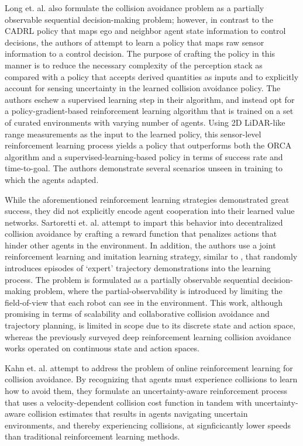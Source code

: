 \documentclass[conference]{IEEEtran}
\begin{document}
Long et. al. \cite{long2018} also formulate the collision avoidance problem as a partially observable sequential decision-making problem; however, in contrast to the CADRL policy that maps ego and neighbor agent state information to control decisions, the authors of \cite{long2018} attempt to learn a policy that maps raw sensor information to a control decision. The purpose of crafting the policy in this manner is to reduce the necessary complexity of the perception stack as compared with a policy that accepts derived quantities as inputs and to explicitly account for sensing uncertainty in the learned collision avoidance policy. The authors eschew a supervised learning step in their algorithm, and instead opt for a policy-gradient-based reinforcement learning algorithm that is trained on a set of curated environments with varying number of agents. Using 2D LiDAR-like range measurements as the input to the learned policy, this sensor-level reinforcement learning process yields a policy that outperforms both the ORCA algorithm and a supervised-learning-based policy in terms of success rate and time-to-goal. The authors demonstrate several scenarios unseen in training to which the agents adapted.

While the aforementioned reinforcement learning strategies demonstrated great success, they did not explicitly encode agent cooperation into their learned value networks. Sartoretti et. al. \cite{sartoretti2019} attempt to impart this behavior into decentralized collision avoidance by crafting a reward function that penalizes actions that hinder other agents in the environment. In addition, the authors use a joint reinforcement learning and imitation learning strategy, similar to \cite{chen2017cadrl}, that randomly introduces episodes of ‘expert’ trajectory demonstrations into the learning process. The problem is formulated as a partially observable sequential decision-making problem, where the partial-observability is introduced by limiting the field-of-view that each robot can see in the environment. This work, although promising in terms of scalability and collaborative collision avoidance and trajectory planning, is limited in scope due to its discrete state and action space, whereas the previously surveyed deep reinforcement learning collision avoidance works operated on continuous state and action spaces.

Kahn et. al. \cite{kahn2017} attempt to address the problem of online reinforcement learning for collision avoidance. By recognizing that agents must experience collisions to learn how to avoid them, they formulate an uncertainty-aware reinforcement process that uses a velocity-dependent collision cost function in tandem with uncertainty-aware collision estimates that results in agents navigating uncertain environments, and thereby experiencing collisions, at signficicantly lower speeds than traditional reinforcement learning methods.
\end{document}
